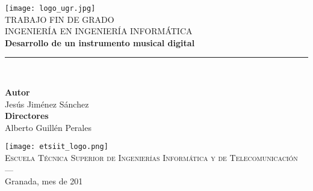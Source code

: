 
\begin{titlepage}

    \newlength{\centeroffset}
    \setlength{\centeroffset}{-0.5\oddsidemargin}
    \addtolength{\centeroffset}{0.5\evensidemargin}
    \thispagestyle{empty}

    \noindent\hspace*{\centeroffset}

    \begin{minipage}{\textwidth}

        \centering
        \texttt{[image: logo\_ugr.jpg]}\\[1.4cm]

        \textsc{ \Large TRABAJO FIN DE GRADO\\[0.2cm]}
        \textsc{ INGENIERÍA EN INGENIERÍA INFORMÁTICA}\\[1cm]
        {\Huge\bfseries Desarrollo de un instrumento musical digital\\
        }
        \noindent\rule[-1ex]{\textwidth}{3pt}\\[3.5ex]

    \end{minipage}

    \vspace{2.5cm}
    \noindent\hspace*{\centeroffset}

    \begin{minipage}{\textwidth}

        \centering

        \textbf{Autor}\\
        { Jesús Jiménez Sánchez }\\
        [2.5ex]
        \textbf{Directores}\\
        { Alberto Guillén Perales\\
        [2cm] }

        \texttt{[image: etsiit\_logo.png]}\\
        [0.1cm]
        \textsc{Escuela Técnica Superior de Ingenierías Informática y de Telecomunicación}\\
        \textsc{---}\\
        Granada, mes de 201

    \end{minipage}

\end{titlepage}
